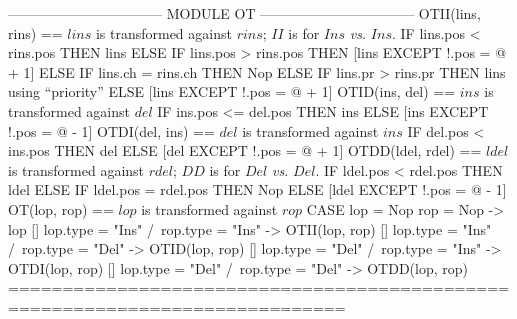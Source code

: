 \documentclass[preview, border={5pt 0pt 5pt 1pt}]{standalone}
\begin{document}
\begin{tla}
--------------------------------- MODULE OT ---------------------------------
OTII(lins, rins) == \* $lins$ is transformed against $rins$; $II$ is for $Ins$ \emph{vs.} $Ins$.
    IF lins.pos < rins.pos THEN lins
    ELSE IF lins.pos > rins.pos
         THEN [lins EXCEPT !.pos = @ + 1]
         ELSE IF lins.ch = rins.ch THEN Nop
              ELSE IF lins.pr > rins.pr THEN lins \* using ``priority''
                   ELSE [lins EXCEPT !.pos = @ + 1]
OTID(ins, del) == \* $ins$ is transformed against $del$
    IF ins.pos <= del.pos THEN ins
                          ELSE [ins EXCEPT !.pos = @ - 1]
OTDI(del, ins) == \* $del$ is transformed against $ins$
    IF del.pos < ins.pos THEN del
                         ELSE [del EXCEPT !.pos = @ + 1]
OTDD(ldel, rdel) == \* $ldel$ is transformed against $rdel$; $DD$ is for $Del$ \emph{vs.} $Del$.
    IF ldel.pos < rdel.pos THEN ldel
    ELSE IF ldel.pos = rdel.pos THEN Nop
         ELSE [ldel EXCEPT !.pos = @ - 1]
OT(lop, rop) == \* $lop$ is transformed against $rop$
    CASE lop = Nop \/ rop = Nop -> lop
       []  lop.type = "Ins" /\ rop.type = "Ins" -> OTII(lop, rop)
       []  lop.type = "Ins" /\ rop.type = "Del" -> OTID(lop, rop)
       []  lop.type = "Del" /\ rop.type = "Ins" -> OTDI(lop, rop)
       []  lop.type = "Del" /\ rop.type = "Del" -> OTDD(lop, rop)
=============================================================================
\end{tla}
\end{document}
